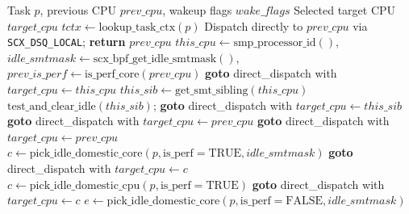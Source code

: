 \documentclass[conference]{IEEEtran}
\begin{document}
\begin{algorithm*}[t]
\caption{OPTIMA-SELECT-CPU (Synchronous IPC Fast-Path \& Asymmetric Domain Selection)}
\label{alg:select_cpu}
\begin{algorithmic}[1]
\footnotesize
\REQUIRE Task $p$, previous CPU $prev\_cpu$, wakeup flags $wake\_flags$
\ENSURE Selected target CPU $target\_cpu$
\STATE $tctx \leftarrow \text{lookup\_task\_ctx}(p)$
    \STATE Dispatch directly to $prev\_cpu$ via \texttt{SCX\_DSQ\_LOCAL}; \textbf{return} $prev\_cpu$
\ENDIF
\STATE $this\_cpu \leftarrow \text{smp\_processor\_id}()$, \quad $idle\_smtmask \leftarrow \text{scx\_bpf\_get\_idle\_smtmask}()$, \quad $prev\_is\_perf \leftarrow \text{is\_perf\_core}(prev\_cpu)$
        \STATE \textbf{goto} direct\_dispatch with $target\_cpu \leftarrow this\_cpu$
    \ENDIF
    \STATE $this\_sib \leftarrow \text{get\_smt\_sibling}(this\_cpu)$
        \STATE $\text{test\_and\_clear\_idle}(this\_sib)$; \quad \textbf{goto} direct\_dispatch with $target\_cpu \leftarrow this\_sib$
    \ENDIF
        \STATE \textbf{goto} direct\_dispatch with $target\_cpu \leftarrow prev\_cpu$
    \ENDIF
\ENDIF
{}
    \STATE \textbf{goto} direct\_dispatch with $target\_cpu \leftarrow prev\_cpu$
\ENDIF
{}
    \STATE $c \leftarrow \text{pick\_idle\_domestic\_core}(p, \text{is\_perf}=\text{TRUE}, idle\_smtmask)$
        \STATE \textbf{goto} direct\_dispatch with $target\_cpu \leftarrow c$
    \ENDIF
    \STATE $c \leftarrow \text{pick\_idle\_domestic\_cpu}(p, \text{is\_perf}=\text{TRUE})$
        \STATE \textbf{goto} direct\_dispatch with $target\_cpu \leftarrow c$
    \ENDIF
\ENDIF
{}
        \STATE $e \leftarrow \text{pick\_idle\_domestic\_core}(p, \text{is\_perf}=\text{FALSE}, idle\_smtmask)$

\end{algorithmic}
\end{algorithm*}
\end{document}

